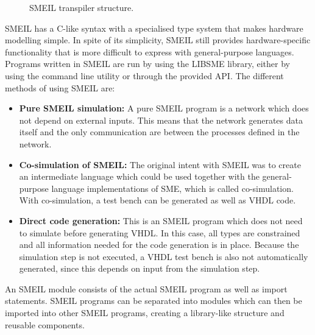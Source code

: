 \begin{figure}[!ht]
  \centering
  \caption{SMEIL transpiler structure.}
  \label{fig:smeil_transpiler}
\end{figure}
SMEIL has a C-like syntax with a specialised type system that makes hardware modelling simple. In spite of its simplicity, SMEIL still provides hardware-specific functionality that is more difficult to express with general-purpose languages.\\

Programs written in SMEIL are run by using the LIBSME library, either by using the command line utility or through the provided API.
The different methods of using SMEIL are:\\
\begin{itemize}
    \item \textbf{Pure SMEIL simulation:} A pure SMEIL program is a network which does not depend on external inputs. This means that the network generates data itself and the only communication are between the processes defined in the network.
    \item \textbf{Co-simulation of SMEIL:} The original intent with SMEIL was to create an intermediate language which could be used together with the general-purpose language implementations of SME, which is called co-simulation. With co-simulation, a test bench can be generated as well as VHDL code.
    \item \textbf{Direct code generation:} This is an SMEIL program which does not need to simulate before generating VHDL. In this case, all types are constrained and all information needed for the code generation is in place. Because the simulation step is not executed, a VHDL test bench is also not automatically generated, since this depends on input from the simulation step.
\end{itemize}
An SMEIL module consists of the actual SMEIL program as well as import statements. SMEIL programs can be separated into modules which can then be imported into other SMEIL programs, creating a library-like structure and reusable components.\\

